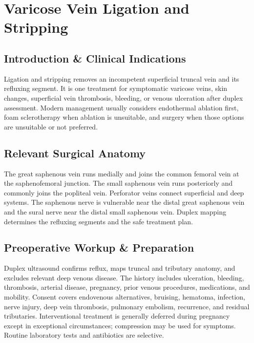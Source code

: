 \chapter{Varicose Vein Ligation and Stripping}

\section*{Introduction \& Clinical Indications}
Ligation and stripping removes an incompetent superficial truncal vein and its refluxing segment. It is one treatment for symptomatic varicose veins, skin changes, superficial vein thrombosis, bleeding, or venous ulceration after duplex assessment. Modern management usually considers endothermal ablation first, foam sclerotherapy when ablation is unsuitable, and surgery when those options are unsuitable or not preferred.

\section*{Relevant Surgical Anatomy}
The great saphenous vein runs medially and joins the common femoral vein at the saphenofemoral junction. The small saphenous vein runs posteriorly and commonly joins the popliteal vein. Perforator veins connect superficial and deep systems. The saphenous nerve is vulnerable near the distal great saphenous vein and the sural nerve near the distal small saphenous vein. Duplex mapping determines the refluxing segments and the safe treatment plan.

\section*{Preoperative Workup \& Preparation}
Duplex ultrasound confirms reflux, maps truncal and tributary anatomy, and excludes relevant deep venous disease. The history includes ulceration, bleeding, thrombosis, arterial disease, pregnancy, prior venous procedures, medications, and mobility. Consent covers endovenous alternatives, bruising, hematoma, infection, nerve injury, deep vein thrombosis, pulmonary embolism, recurrence, and residual tributaries. Interventional treatment is generally deferred during pregnancy except in exceptional circumstances; compression may be used for symptoms. Routine laboratory tests and antibiotics are selective.

